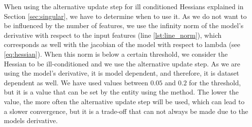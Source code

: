 \documentclass[12pt]{extarticle}
\numberwithin{equation}{section}
\begin{document}
When using the alternative update step for ill conditioned Hessians explained in Section \ref{sec:singular}, we have to determine when to use it. As we do not want to be influenced by the number of features, we use the infinity norm of the model's derivative with respect to the input features (line \ref{lst:line_norm}), which corresponds as well with the jacobian of the model with respect to lambda (see \eqref{eq:hessian}). When this norm is below a certain threshold, we consider the Hessian to be ill-conditioned and we use the alternative update step. As we are using the model's derivative, it is model dependent, and therefore, it is dataset dependent as well. We have used values between $0.05$ and $0.2$ for the threshold, but it is a value that can be set by the entity using the method. The lower the value, the more often the alternative update step will be used, which can lead to a slower convergence, but it is a trade-off that can not always be made due to the models derivative.
\end{document}
